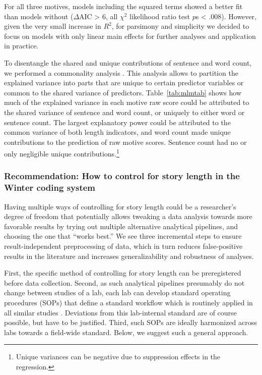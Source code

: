 \documentclass[man,a4paper,mask]{apa6}\usepackage[]{graphicx}\usepackage[]{color}
\begin{document}
For all three motives, models including the squared terms showed a better fit than models without ($\Delta$AIC > 6, all $\chi^2$ likelihood ratio test $p$s < .008). However, given the very small increase in $R^2$, for parsimony and simplicity we decided to focus on models with only linear main effects for further analyses and application in practice.


To disentangle the shared and unique contributions of sentence and word count, we performed a commonality analysis \parencite{nimon_r_2008}. This analysis allows to partition the explained variance into parts that are unique to certain predictor variables or common to the shared variance of predictors. Table~\ref{tab:mlmtab} shows how much of the explained variance in each motive raw score could be attributed to the shared variance of sentence and word count, or uniquely to either word or sentence count. The largest explanatory power could be attributed to the common variance of both length indicators, and word count made unique contributions to the prediction of raw motive scores. Sentence count had no or only negligible unique contributions.\footnote{Unique variances can be negative due to suppression effects in the regression.}


\subsubsection{Recommendation: How to control for story length in the Winter coding system}
Having multiple ways of controlling for story length could be a researcher's degree of freedom \parencite{john_measuring_2012} that potentially allows tweaking a data analysis towards more favorable results by trying out multiple alternative analytical pipelines, and choosing the one that ``works best.'' We see three incremental steps to ensure result-independent preprocessing of data, which in turn reduces false-positive results in the literature and increases generalizability and robustness of analyses. 

First, the specific method of controlling for story length can be preregistered before data collection. Second, as such analytical pipelines presumably do not change between studies of a lab, each lab can develop standard operating procedures (SOPs) that define a standard workflow which is routinely applied in all similar studies \parencite{lin_StandardOperatingProcedures_2016}. Deviations from this lab-internal standard are of course possible, but have to be justified. Third, such SOPs are ideally harmonized across labs towards a field-wide standard. Below, we suggest such a general approach.
\end{document}

